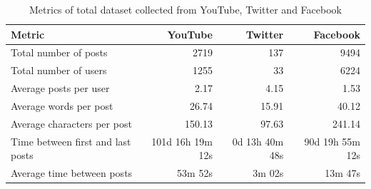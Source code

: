 \begin{table}
\centering
\caption{Metrics of total dataset collected from YouTube, Twitter and Facebook}
\label{table:results:totalstats}
\begin{tabular}{ l | r  r  r }
\textbf{Metric} & \textbf{YouTube} & \textbf{Twitter} & \textbf{Facebook} \\
\hline
Total number of posts 				& 2719 & 137 & 9494 \\

Total number of users 				& 1255 & 33 & 6224 \\

Average posts per user 				& 2.17 & 4.15 & 1.53 \\

Average words per post 				& 26.74& 15.91 & 40.12  \\

Average characters per post 		& 150.13 & 97.63 & 241.14 \\

Time between first and last posts 	& 101d 16h 19m 12s & 0d 13h 40m 48s & 90d 19h 55m 12s\\

Average time between posts			& 53m 52s & 3m 02s & 13m 47s \\

\end{tabular}
\end{table}



